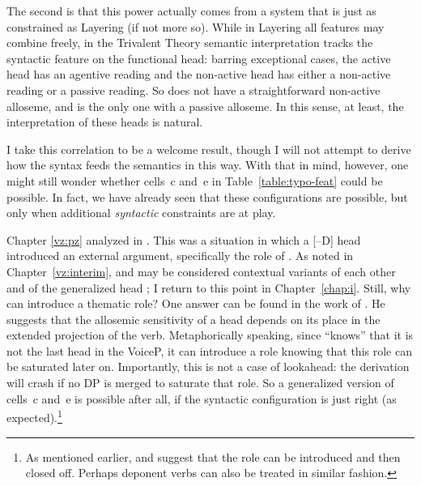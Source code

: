 \begin{exe}
\begin{xlist}
\begin{exe}
\begin{exe}
\begin{xlist}
\begin{exe}
\begin{exe}
\begin{exe}
\begin{exe}
\begin{exe}
\begin{xlist}
\label{r1:6:2}The second is that this power actually comes from a system that is just as constrained as Layering (if not more so). While in Layering all features may combine freely, in the Trivalent Theory semantic interpretation tracks the syntactic feature on the functional head: barring exceptional cases, the active head {\vd} has an agentive reading and the non-active head {\vz} has either a non-active reading or a passive reading. So {\vd} does not have a straightforward non-active alloseme, and {\vz} is the only one with a passive alloseme. In this sense, at least, the interpretation of these heads is natural.

I take this correlation to be a welcome result, though I will not attempt to derive how the syntax feeds the semantics in this way. With that in mind, however, one might still wonder whether cells~c and~e in Table~\ref{table:typo-feat} could be possible. In fact, we have already seen that these configurations are possible, but only when additional \emph{syntactic} constraints are at play.

Chapter \ref{vz:pz} analyzed  in {\tnif}. This was a situation in which a [--D] head introduced an external argument, specifically the  role of {\pz}. As noted in Chapter~\ref{vz:interim}, {\pz} and {\vz} may be considered contextual variants of each other and of the generalized head \emph{}; I return to this point in Chapter~\ref{chap:i}. Still, why can {\pz} introduce a thematic role? One answer can be found in the work of \cite{wood15springer}. He suggests that the allosemic sensitivity of a head depends on its place in the extended projection of the verb. Metaphorically speaking, since {\pz} ``knows'' that it is not the last head in the VoiceP, it can introduce a  role knowing that this role can be saturated later on. Importantly, this is not a case of lookahead: the derivation will crash if no DP is merged to saturate that role. So a generalized version of cells~c and~e is possible after all, if the syntactic configuration is just right (as expected).\footnote{As mentioned earlier, \cite{legate14} and \cite{akkus19jl} suggest that the  role can be introduced and then closed off. Perhaps deponent verbs can also be treated in similar fashion.}


\end{xlist}
\end{exe}
\end{exe}
\end{exe}
\end{exe}
\end{exe}
\end{xlist}
\end{exe}
\end{exe}
\end{xlist}
\end{exe}
